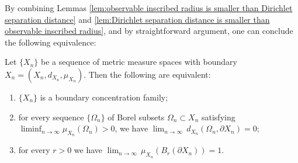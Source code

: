 By combining Lemmas \ref{lem:observable inscribed radius is smaller than Dirichlet separation distance} and \ref{lem:Dirichlet separation distance is smaller than observable inscribed radius},
and by straightforward argument,
one can conclude the following equivalence:
\begin{prop}\label{prop:characterization of Dirichlet Levy}
Let $\{X_{n}\}$ be a sequence of metric measure spaces with boundary $X_{n}=(X_{n},d_{X_{n}},\mu_{X_{n}})$.
Then the following are equivalent:
\begin{enumerate}\setlength{\itemsep}{+0.7mm}
\item $\{X_{n}\}$ is a boundary concentration family;
\item for every sequence $\{\Omega_{n}\}$ of Borel subsets $\Omega_{n} \subset X_{n}$ satisfying $\liminf_{n\to \infty} \mu_{X_{n}}(\Omega_{n})>0$,
         we have $\lim_{n\to \infty}\, d_{X_{n}}(\Omega_{n},\partial X_{n})=0$;
\item for every $r>0$
         we have $\lim_{n\to \infty}\,\mu_{X_{n}}(B_{r}(\partial X_{n}))=1$.
\end{enumerate}
\end{prop}

